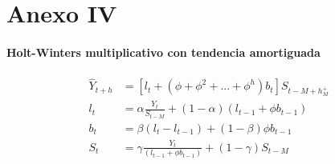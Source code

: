 \documentclass[12pt,a4paper,oneside]{article}
\begin{document}
\part*{Anexo IV}

\subsection*{Holt-Winters multiplicativo con tendencia amortiguada}

\begin{align}
  \widehat{Y}_{t+h} &= [l_t + (\phi + \phi^2 + ... + \phi^h)b_t] S_{t - M + h^+_M} \\
  l_t &= \alpha \frac{Y_t}{S_{t-M}} + (1 -\alpha)(l_{t-1}+ \phi b_{t-1}) \\
  b_t &= \beta(l_t - l_{t-1}) + (1 -\beta) \phi b_{t-1} \\
  S_t &= \gamma \frac{Y_t}{(l_{t-1} + \phi b_{t-1})} + (1 - \gamma) S_{t-M}
\end{align} 
\end{document}
